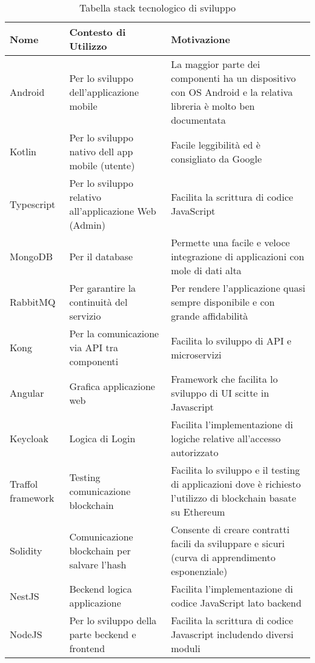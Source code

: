     \begin{longtable}{ C{5cm} C{4cm} C{5cm} }
        \caption{Tabella stack tecnologico di sviluppo}                                                                                 \\
        \rowcolor{\primaryColor}
        \textcolor{\secondaryColor}{\textbf{Nome}} & \textcolor{\secondaryColor}{\textbf{Contesto di Utilizzo}} & \textcolor{\secondaryColor}{\textbf{Motivazione}}\\ \endhead
        {Android} & {Per lo sviluppo dell'applicazione mobile}   & {La maggior parte dei componenti ha un dispositivo con OS Android e la relativa libreria è molto ben documentata}\\
        {Kotlin} & {Per lo sviluppo nativo dell app mobile (utente)} & {Facile leggibilità ed è consigliato da Google} \\
        {Typescript} & {Per lo sviluppo relativo all'applicazione Web (Admin)} & { Facilita la scrittura di codice JavaScript } \\
        {MongoDB} & {Per il database} & { Permette una facile e veloce integrazione di applicazioni con mole di dati alta } \\
        {RabbitMQ} & {Per garantire la continuità del servizio} & {Per rendere l'applicazione quasi sempre disponibile e con grande affidabilità} \\
        {Kong} & {Per la comunicazione via API tra componenti} & {Facilita lo sviluppo di API e microservizi} \\
        {Angular} & {Grafica applicazione web} & {Framework che facilita lo sviluppo di UI scitte in Javascript} \\
        {Keycloak} & {Logica di Login} & {Facilita l'implementazione di logiche relative all'accesso autorizzato} \\
        {Traffol framework} & {Testing comunicazione blockchain} & {Facilita lo sviluppo e il testing di applicazioni dove è richiesto l'utilizzo di blockchain basate su Ethereum} \\
        {Solidity} & {Comunicazione blockchain per salvare l'hash} & {Consente di creare contratti facili da sviluppare e sicuri (curva di apprendimento esponenziale)} \\
        {NestJS} & {Beckend logica applicazione} & {Facilita l'implementazione di codice JavaScript lato backend} \\
        {NodeJS} & {Per lo sviluppo della parte beckend e frontend} & {Facilita la scrittura di codice Javascript includendo diversi moduli} \\
    \end{longtable}
    
